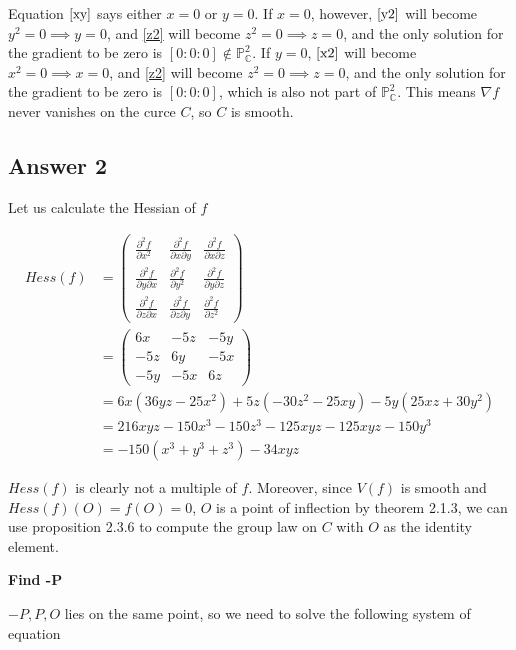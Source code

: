 \documentclass{article}
\theoremstyle{definition}
\theoremstyle{definition}
\theoremstyle{remark}
\newcommand{\bb}[1]{\mathbb{#1}} %
\begin{document}
Equation $\eqref{xy}$ says either $x = 0$ or $y = 0$.
If $x = 0$, however, $\eqref{y2}$ will become $y^2 = 0 \implies y = 0$, and \eqref{z2} will become $z^2 = 0 \implies z = 0$, and the only solution for the gradient to be zero is $[0:0:0] \notin \mathbb{P}^2_{\bb{C}}$.
If $y = 0$, $\eqref{x2}$ will become $x^2 = 0 \implies x = 0$, and \eqref{z2} will become $z^2 = 0 \implies z = 0$, and the only solution for the gradient to be zero is $[0:0:0]$, which is also not part of $\mathbb{P}^2_{\bb{C}}$.
This means $\nabla f$ never vanishes on the curce $C$, so $C$ is smooth.

\subsection*{Answer 2}

Let us calculate the Hessian of $f$

\begin{align}
	Hess(f) 
	&= \begin{pmatrix}
		\frac{\partial ^2 f}{\partial x^2} & \frac{\partial ^2 f}{\partial x \partial y} & \frac{\partial ^2 f}{\partial x \partial z} \\ 
		\frac{\partial ^2 f}{\partial y \partial x} & \frac{\partial ^2 f}{\partial y^2} & \frac{\partial ^2 f}{\partial y \partial z} \\ 
		\frac{\partial ^2 f}{\partial z \partial x} & \frac{\partial ^2 f}{\partial z \partial y} & \frac{\partial ^2 f}{\partial z^2}
	\end{pmatrix}\\
	&=
	\begin{pmatrix}
		6x & -5z & -5y \\
		-5z & 6y & -5x \\
		-5y & -5x & 6z
	\end{pmatrix} \\
	& = 
	6x(36yz - 25x^2) + 5z(-30z^2 - 25xy) - 5y(25xz + 30 y^2) \\
	& = 216xyz - 150x^3 - 150z^3 - 125xyz -125 xyz -150y^3 \\
	& = -150(x^3 + y^3 + z^3) -34 xyz
\end{align}

$Hess(f)$ is clearly not a multiple of $f$.
Moreover, since $V(f)$ is smooth and $Hess(f)(O) = f(O) = 0$, $O$ is a point of inflection by theorem 2.1.3,
we can use proposition 2.3.6 to compute the group law on $C$ with $O$ as the identity element.

\textbf{Find -P}

$-P, P, O$ lies on the same point, so we need to solve the following system of equation 
\end{document}

